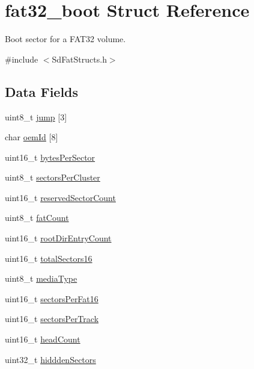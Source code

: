 \hypertarget{structfat32__boot}{\section{fat32\-\_\-boot Struct Reference}
\label{structfat32__boot}
}


Boot sector for a F\-A\-T32 volume.  




{\ttfamily \#include $<$Sd\-Fat\-Structs.\-h$>$}

\subsection*{Data Fields}
\begin{DoxyCompactItemize}
\item 
uint8\-\_\-t \hyperlink{structfat32__boot_a61b95cffdd449d10352cfd0288b23287}{jump} \mbox{[}3\mbox{]}
\item 
char \hyperlink{structfat32__boot_adff248465625d1fa3583bfcf2838620d}{oem\-Id} \mbox{[}8\mbox{]}
\item 
uint16\-\_\-t \hyperlink{structfat32__boot_adb2ddeae74baf681103d21d724814a63}{bytes\-Per\-Sector}
\item 
uint8\-\_\-t \hyperlink{structfat32__boot_a3ce07376c286acd8393a18a32d7ca4c0}{sectors\-Per\-Cluster}
\item 
uint16\-\_\-t \hyperlink{structfat32__boot_a16c854faf567331bbbfb383e6c8df6f5}{reserved\-Sector\-Count}
\item 
uint8\-\_\-t \hyperlink{structfat32__boot_a624e9eb125b4fc8aeaebcccf79e17aa8}{fat\-Count}
\item 
uint16\-\_\-t \hyperlink{structfat32__boot_aabe25e54b9c06a9a7393fc6c475d9fa1}{root\-Dir\-Entry\-Count}
\item 
uint16\-\_\-t \hyperlink{structfat32__boot_ad717f5b9af13f8ec9d0d6d1337174dfa}{total\-Sectors16}
\item 
uint8\-\_\-t \hyperlink{structfat32__boot_ab88738f9cb91c882cb91d5e83a19a73f}{media\-Type}
\item 
uint16\-\_\-t \hyperlink{structfat32__boot_abf85d1c57b01c8901a0cdcd0ac1babc2}{sectors\-Per\-Fat16}
\item 
uint16\-\_\-t \hyperlink{structfat32__boot_a42886f9109ee1759d5972e871f0689a8}{sectors\-Per\-Track}
\item 
uint16\-\_\-t \hyperlink{structfat32__boot_a57cb7e16b9969fa87c9f1ca43a87d217}{head\-Count}
\item 
uint32\-\_\-t \hyperlink{structfat32__boot_a454fd6cc3f063c86b7fe65c367da7cdd}{hiddden\-Sectors}

\end{DoxyCompactItemize}
